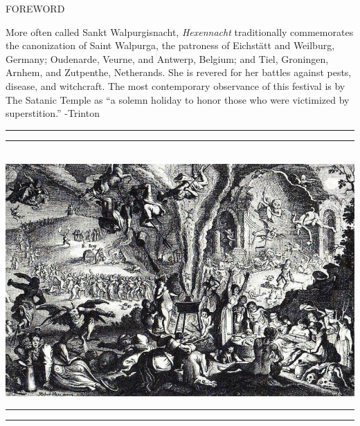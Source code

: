 \documentclass[11pt]{article}
\begin{document}
\vspace*{1\baselineskip}

\begingroup
\begin{center}

\end{center}
\endgroup

\begingroup
\begin{center}
\huge FOREWORD
\end{center}
\endgroup

\vspace*{2\baselineskip}

\begingroup
\begin{center}
More often called Sankt Walpurgisnacht, \textit{Hexennacht} traditionally commemorates the canonization of Saint Walpurga, the patroness of Eichstätt and Weilburg, Germany; Oudenarde, Veurne, and Antwerp, Belgium; and Tiel, Groningen, Arnhem, and Zutpenthe, Netherands. She is revered for her battles against pests, disease, and witchcraft. The most contemporary observance of this festival is by The Satanic Temple as ``a solemn holiday to honor those who were victimized by superstition.''
\rightskip\leftskip
\phantom{text} \hfill -Trinton
\end{center}
\endgroup

\vspace*{5\baselineskip}

\begingroup
\begin{center}
\rule{\textwidth}{1.6pt}\vspace*{-\baselineskip}\vspace*{2pt}
\rule{\textwidth}{0.4pt}\\[\baselineskip]
\includegraphics[scale=0.5]{hex_1.jpeg}
\rule{\textwidth}{0.4pt}\vspace*{-\baselineskip}\vspace{3.2pt}
\rule{\textwidth}{1.6pt}\\[\baselineskip]
\end{center}
\endgroup
\end{document}
